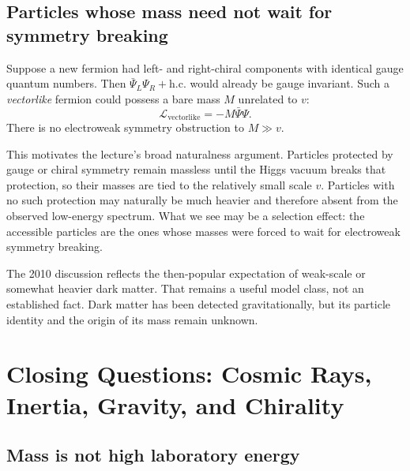 \subsection{Particles whose mass need not wait for symmetry breaking}

Suppose a new fermion had left- and right-chiral components with identical
gauge quantum numbers. Then
\(\bar\Psi_L\Psi_R+\mathrm{h.c.}\) would already be gauge invariant. Such a
\emph{vectorlike} fermion could possess a bare mass \(M\) unrelated to
\(v\):
\begin{equation}
  \mathcal L_{\mathrm{vectorlike}}
  =-M\bar\Psi\Psi.
  \label{eq:l09-vectorlike-mass}
\end{equation}
There is no electroweak symmetry obstruction to \(M\gg v\).

This motivates the lecture's broad naturalness argument. Particles protected
by gauge or chiral symmetry remain massless until the Higgs vacuum breaks
that protection, so their masses are tied to the relatively small scale
\(v\). Particles with no such protection may naturally be much heavier and
therefore absent from the observed low-energy spectrum. What we see may be
a selection effect: the accessible particles are the ones whose masses were
forced to wait for electroweak symmetry breaking.

\begin{classroomqa}
\end{classroomqa}

The 2010 discussion reflects the then-popular expectation of weak-scale or
somewhat heavier dark matter. That remains a useful model class, not an
established fact. Dark matter has been detected gravitationally, but its
particle identity and the origin of its mass remain unknown.

\section{Closing Questions: Cosmic Rays, Inertia, Gravity, and Chirality}

\subsection{Mass is not high laboratory energy}

